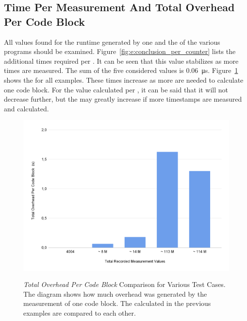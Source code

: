 \subsection{Time Per Measurement And Total Overhead Per Code Block}
All values found for the runtime generated by one \MEASUREVALUE and the \TOTALCODEBLOCK of the various programs should be examined. Figure~\ref{fig:e:conclusion_per_counter} lists the additional times required per \MEASUREVALUE. It can be seen that this value stabilizes as more times are measured. The sum of the five considered values is \SI{0.06}{\micro\second}. Figure~\ref{fig:e:conclusion_per_array_entry} shows the \TOTALCODEBLOCK for all examples. These times increase as more \MEASUREVALUES are needed to calculate one code block. For the value calculated per \MEASUREVALUE, it can be said that it will not decrease further, but the \TOTALCODEBLOCK may greatly increase if more timestamps are measured and calculated.

\begin{figure}[t]
    \centering
    \caption[\emph{Total Overhead Per Code Block} Comparison for Various Test Cases.]{\emph{Total Overhead Per Code Block} Comparison for Various Test Cases. The diagram shows how much overhead was generated by the measurement of one code block. The \TOTALCODEBLOCK calculated in the previous examples are compared to each other.}
    \includegraphics[width=\textwidth]{graphics/e_conclusion_per_array_entry.png}
    \label{fig:e:conclusion_per_array_entry}
\end{figure}

